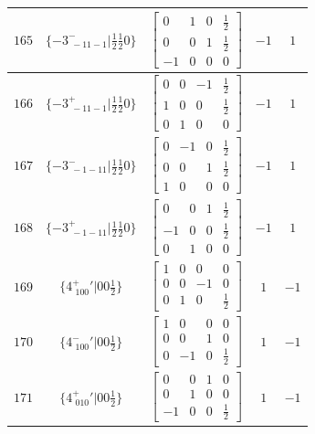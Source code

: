 \documentclass[fleqn,8pt]{jsarticle}
\begin{document}
\begin{longtable}{ccccc}
$ 165 $ & $ \{-3^{-}_{\,\,-11-1}|\frac{1}{2} \frac{1}{2} 0\} $ & $ \begin{bmatrix} 0 & 1 & 0 & \frac{1}{2} \\ 0 & 0 & 1 & \frac{1}{2} \\ -1 & 0 & 0 & 0 \end{bmatrix} $ & $ -1 $ & $ 1 $ \\ \hline
$ 166 $ & $ \{-3^{+}_{\,\,-11-1}|\frac{1}{2} \frac{1}{2} 0\} $ & $ \begin{bmatrix} 0 & 0 & -1 & \frac{1}{2} \\ 1 & 0 & 0 & \frac{1}{2} \\ 0 & 1 & 0 & 0 \end{bmatrix} $ & $ -1 $ & $ 1 $ \\ \hline
$ 167 $ & $ \{-3^{-}_{\,\,-1-11}|\frac{1}{2} \frac{1}{2} 0\} $ & $ \begin{bmatrix} 0 & -1 & 0 & \frac{1}{2} \\ 0 & 0 & 1 & \frac{1}{2} \\ 1 & 0 & 0 & 0 \end{bmatrix} $ & $ -1 $ & $ 1 $ \\ \hline
$ 168 $ & $ \{-3^{+}_{\,\,-1-11}|\frac{1}{2} \frac{1}{2} 0\} $ & $ \begin{bmatrix} 0 & 0 & 1 & \frac{1}{2} \\ -1 & 0 & 0 & \frac{1}{2} \\ 0 & 1 & 0 & 0 \end{bmatrix} $ & $ -1 $ & $ 1 $ \\ \hline
$ 169 $ & $ \{4^{+}_{\,\,100}{}'|0 0 \frac{1}{2}\} $ & $ \begin{bmatrix} 1 & 0 & 0 & 0 \\ 0 & 0 & -1 & 0 \\ 0 & 1 & 0 & \frac{1}{2} \end{bmatrix} $ & $ 1 $ & $ -1 $ \\ \hline
$ 170 $ & $ \{4^{-}_{\,\,100}{}'|0 0 \frac{1}{2}\} $ & $ \begin{bmatrix} 1 & 0 & 0 & 0 \\ 0 & 0 & 1 & 0 \\ 0 & -1 & 0 & \frac{1}{2} \end{bmatrix} $ & $ 1 $ & $ -1 $ \\ \hline
$ 171 $ & $ \{4^{+}_{\,\,010}{}'|0 0 \frac{1}{2}\} $ & $ \begin{bmatrix} 0 & 0 & 1 & 0 \\ 0 & 1 & 0 & 0 \\ -1 & 0 & 0 & \frac{1}{2} \end{bmatrix} $ & $ 1 $ & $ -1 $ \\ \hline

\end{longtable}
\end{document}
